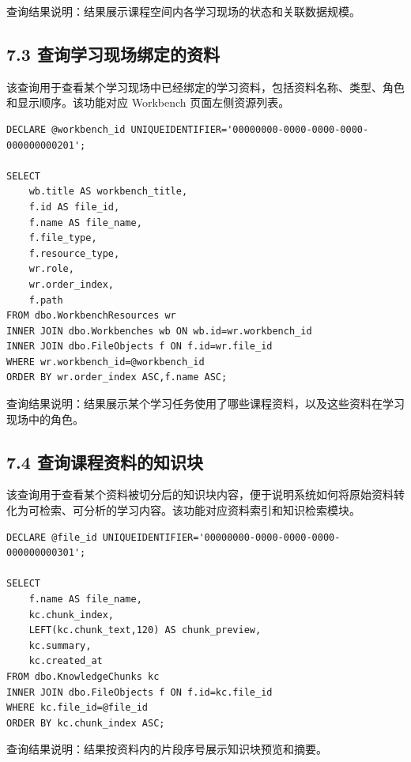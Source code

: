 \documentclass[10pt,a4paper,fontset=none]{ctexart}
\begin{document}
查询结果说明：结果展示课程空间内各学习现场的状态和关联数据规模。\par

\subsection*{7.3 查询学习现场绑定的资料}

该查询用于查看某个学习现场中已经绑定的学习资料，包括资料名称、类型、角色和显示顺序。该功能对应 Workbench 页面左侧资源列表。\par

\begin{Verbatim}[fontsize=\scriptsize,frame=single]
DECLARE @workbench_id UNIQUEIDENTIFIER='00000000-0000-0000-0000-000000000201';

SELECT
    wb.title AS workbench_title,
    f.id AS file_id,
    f.name AS file_name,
    f.file_type,
    f.resource_type,
    wr.role,
    wr.order_index,
    f.path
FROM dbo.WorkbenchResources wr
INNER JOIN dbo.Workbenches wb ON wb.id=wr.workbench_id
INNER JOIN dbo.FileObjects f ON f.id=wr.file_id
WHERE wr.workbench_id=@workbench_id
ORDER BY wr.order_index ASC,f.name ASC;
\end{Verbatim}

查询结果说明：结果展示某个学习任务使用了哪些课程资料，以及这些资料在学习现场中的角色。\par

\subsection*{7.4 查询课程资料的知识块}

该查询用于查看某个资料被切分后的知识块内容，便于说明系统如何将原始资料转化为可检索、可分析的学习内容。该功能对应资料索引和知识检索模块。\par

\begin{Verbatim}[fontsize=\scriptsize,frame=single]
DECLARE @file_id UNIQUEIDENTIFIER='00000000-0000-0000-0000-000000000301';

SELECT
    f.name AS file_name,
    kc.chunk_index,
    LEFT(kc.chunk_text,120) AS chunk_preview,
    kc.summary,
    kc.created_at
FROM dbo.KnowledgeChunks kc
INNER JOIN dbo.FileObjects f ON f.id=kc.file_id
WHERE kc.file_id=@file_id
ORDER BY kc.chunk_index ASC;
\end{Verbatim}

查询结果说明：结果按资料内的片段序号展示知识块预览和摘要。\par
\end{document}
